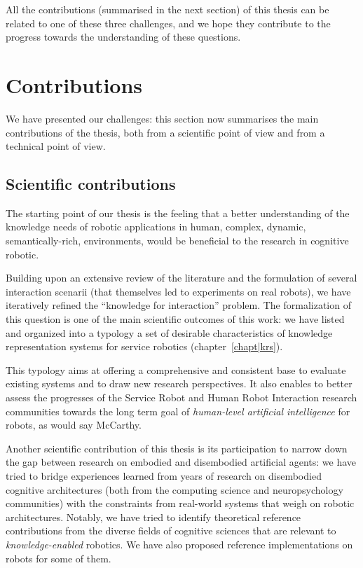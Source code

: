 All the contributions (summarised in the next section) of this thesis can be
related to one of these three challenges, and we hope they contribute to the
progress towards the understanding of these questions.



\section{Contributions}
\label{sect|contributions}

We have presented our challenges: this section now summarises the main
contributions of the thesis, both from a scientific point of view and from a
technical point of view.

\subsection{Scientific contributions}
\label{sect|scientific-contributions}

The starting point of our thesis is the feeling that a better understanding of
the knowledge needs of robotic applications in human, \ie complex, dynamic,
semantically-rich, environments, would be beneficial to the research in
cognitive robotic.

Building upon an extensive review of the literature and the formulation of
several interaction scenarii (that themselves led to experiments on real
robots), we have iteratively refined the ``knowledge for interaction'' problem.
The formalization of this question is one of the main scientific outcomes of
this work: we have listed and organized into a typology a set of desirable
characteristics of knowledge representation systems for service robotics
(chapter~\ref{chapt|krs}).

This typology aims at offering a comprehensive and consistent base to evaluate
existing systems and to draw new research perspectives. It also enables to
better assess the progresses of the Service Robot and Human Robot Interaction
research communities towards the long term goal of \emph{human-level artificial
intelligence} for robots, as would say McCarthy.

Another scientific contribution of this thesis is its participation to narrow
down the gap between research on embodied and disembodied artificial agents: we
have tried to bridge experiences learned from years of research on disembodied
cognitive architectures (both from the computing science and neuropsychology
communities) with the constraints from real-world systems that weigh on robotic
architectures. Notably, we have tried to identify theoretical reference
contributions from the diverse fields of cognitive sciences that are relevant
to \emph{knowledge-enabled} robotics. We have also proposed reference
implementations on robots for some of them.

